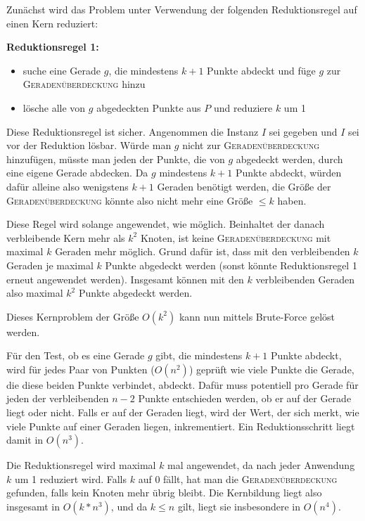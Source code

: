 

\DeclareMathOperator{\vc}{vc}





Zunächst wird das Problem unter Verwendung der folgenden Reduktionsregel auf einen Kern reduziert:

\textbf{Reduktionsregel 1:}
\begin{itemize}
\item suche eine Gerade $g$, die mindestens $k+1$ Punkte abdeckt und füge $g$ zur \mbox{\textsc{Geradenüberdeckung}} hinzu
\item lösche alle von $g$ abgedeckten Punkte aus $P$ und reduziere $k$ um 1
\end{itemize}
Diese Reduktionsregel ist sicher. Angenommen die Instanz $I$ sei gegeben und $I$ sei vor der Reduktion lösbar. Würde man $g$ nicht zur \textsc{Geradenüberdeckung} hinzufügen, müsste man jeden der Punkte, die von $g$ abgedeckt werden, durch eine eigene Gerade abdecken. Da $g$ mindestens $k+1$ Punkte abdeckt, würden dafür alleine also wenigstens $k+1$ Geraden benötigt werden, die Größe der \textsc{Geradenüberdeckung} könnte also nicht mehr eine Größe ${\leq}k$ haben.

Diese Regel wird solange angewendet, wie möglich. Beinhaltet der danach verbleibende Kern mehr als $k^2$ Knoten, ist keine \textsc{Geradenüberdeckung} mit maximal $k$ Geraden mehr möglich. Grund dafür ist, dass mit den verbleibenden $k$ Geraden je maximal $k$ Punkte abgedeckt werden (sonst könnte Reduktionsregel 1 erneut angewendet werden). Insgesamt können mit den $k$ verbleibenden Geraden also maximal $k^2$ Punkte abgedeckt werden.

Dieses Kernproblem der Größe $O(k^2)$ kann nun mittels Brute-Force gelöst werden.

Für den Test, ob es eine Gerade $g$ gibt, die mindestens $k+1$ Punkte abdeckt, wird für jedes Paar von Punkten ($O(n^2)$) geprüft wie viele Punkte die Gerade, die diese beiden Punkte verbindet, abdeckt. Dafür muss potentiell pro Gerade für jeden der verbleibenden $n-2$ Punkte entschieden werden, ob er auf der Gerade liegt oder nicht. Falls er auf der Geraden liegt, wird der Wert, der sich merkt, wie viele Punkte auf einer Geraden liegen, inkrementiert. Ein Reduktionsschritt liegt damit in $O(n^3)$.

Die Reduktionsregel wird maximal $k$ mal angewendet, da nach jeder Anwendung $k$ um 1 reduziert wird. Falls $k$ auf 0 fällt, hat man die \textsc{Geradenüberdeckung} gefunden, falls kein Knoten mehr übrig bleibt. Die Kernbildung liegt also insgesamt in $O(k*n^3)$, und da $k{\leq}n$ gilt, liegt sie insbesondere in $O(n^4)$.

